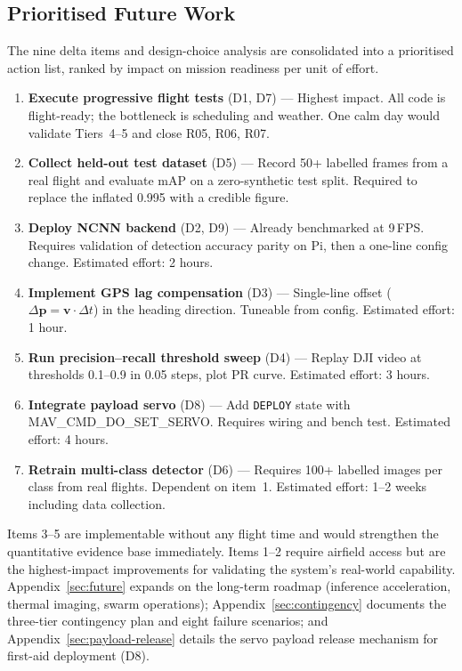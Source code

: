 \subsection{Prioritised Future Work}\label{sec:future-priorities}

The nine delta items and design-choice analysis are consolidated into a prioritised action list, ranked by impact on mission readiness per unit of effort.

\begin{enumerate}[nosep]
    \item \textbf{Execute progressive flight tests} (D1, D7) --- Highest impact. All code is flight-ready; the bottleneck is scheduling and weather. One calm day would validate Tiers~4--5 and close R05, R06, R07.
    \item \textbf{Collect held-out test dataset} (D5) --- Record 50+ labelled frames from a real flight and evaluate mAP on a zero-synthetic test split. Required to replace the inflated 0.995 with a credible figure.
    \item \textbf{Deploy NCNN backend} (D2, D9) --- Already benchmarked at 9\,FPS. Requires validation of detection accuracy parity on Pi, then a one-line config change. Estimated effort: 2 hours.
    \item \textbf{Implement GPS lag compensation} (D3) --- Single-line offset ($\Delta\mathbf{p} = \mathbf{v} \cdot \Delta t$) in the heading direction. Tuneable from config. Estimated effort: 1 hour.
    \item \textbf{Run precision--recall threshold sweep} (D4) --- Replay DJI video at thresholds 0.1--0.9 in 0.05 steps, plot PR curve. Estimated effort: 3 hours.
    \item \textbf{Integrate payload servo} (D8) --- Add \texttt{DEPLOY} state with MAV\_CMD\_DO\_SET\_SERVO. Requires wiring and bench test. Estimated effort: 4 hours.
    \item \textbf{Retrain multi-class detector} (D6) --- Requires 100+ labelled images per class from real flights. Dependent on item~1. Estimated effort: 1--2 weeks including data collection.
\end{enumerate}

Items 3--5 are implementable without any flight time and would strengthen the quantitative evidence base immediately. Items 1--2 require airfield access but are the highest-impact improvements for validating the system's real-world capability. Appendix~\ref{sec:future} expands on the long-term roadmap (inference acceleration, thermal imaging, swarm operations); Appendix~\ref{sec:contingency} documents the three-tier contingency plan and eight failure scenarios; and Appendix~\ref{sec:payload-release} details the servo payload release mechanism for first-aid deployment (D8).

